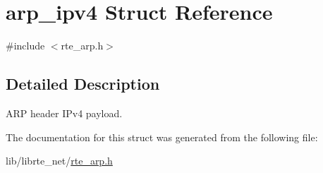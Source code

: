 \hypertarget{structarp__ipv4}{}\section{arp\+\_\+ipv4 Struct Reference}
\label{structarp__ipv4}


{\ttfamily \#include $<$rte\+\_\+arp.\+h$>$}



\subsection{Detailed Description}
A\+R\+P header I\+Pv4 payload. 

The documentation for this struct was generated from the following file\+:\begin{DoxyCompactItemize}
\item 
lib/librte\+\_\+net/\hyperlink{rte__arp_8h}{rte\+\_\+arp.\+h}\end{DoxyCompactItemize}
